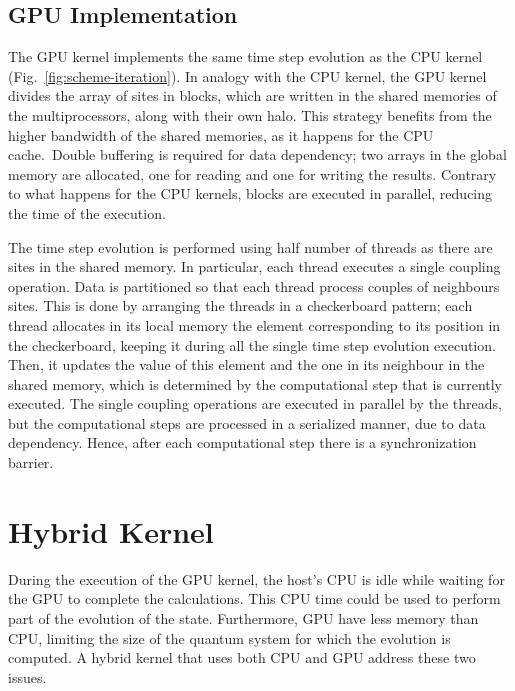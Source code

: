 
\subsection{GPU Implementation}
The GPU kernel implements the same time step evolution as the CPU kernel (Fig.~\ref{fig:scheme-iteration}). In analogy with the CPU kernel, the  GPU kernel divides the array of sites in blocks, which are written in the shared memories of the multiprocessors, along with their own halo. This strategy benefits from the higher bandwidth of the shared memories, as it happens for the CPU cache.~Double buffering is required for data dependency; two arrays in the global memory are allocated, one for reading and one for writing the results. Contrary to what happens for the CPU kernels, blocks are executed in parallel, reducing the time of the execution. 

The time step evolution is performed using half number of threads as there are sites in the shared memory. In particular, each thread executes a single coupling operation. Data is partitioned so that each thread process couples of neighbours sites. This is done by arranging the threads in a checkerboard pattern; each thread allocates in its local memory the element corresponding to its position in the checkerboard, keeping it during all the single time step evolution execution. Then, it updates the value of this element and the one in its neighbour in the shared memory, which is determined by the computational step that is currently executed. The single coupling operations are executed in parallel by the threads, but the computational steps are processed in a serialized manner, due to data dependency. Hence, after each computational step there is a synchronization barrier. 

\section{Hybrid Kernel}
During the execution of the GPU kernel, the host's CPU is idle while waiting for the GPU to complete the calculations. This CPU time could be used to perform part of the evolution of the state. Furthermore, GPU have less memory than CPU, limiting the size of the quantum system for which the evolution is computed. A hybrid kernel that uses both CPU and GPU address these two issues.

